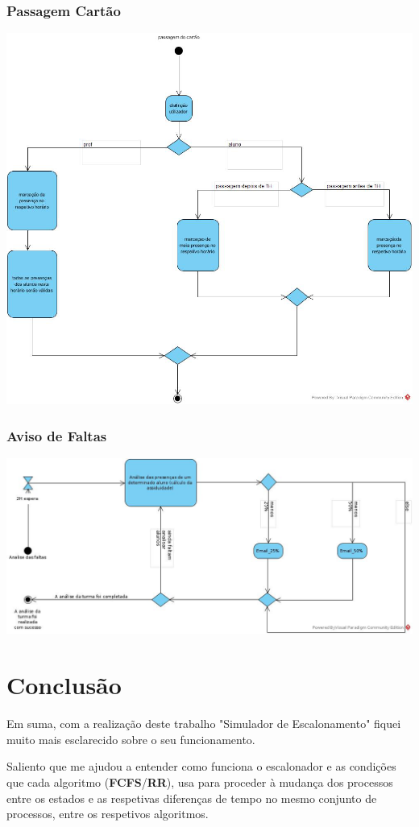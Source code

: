 \documentclass[11pt]{article}   %
\begin{document}
\subsubsection{Passagem Cartão}
    \includegraphics[width=\textwidth]{images/diagrama_atividades_cartao.png}

\subsubsection{Aviso de Faltas}
    \includegraphics[width=\textwidth]{images/diagrama_atividades_faltas.png}

\newpage
\section{Conclusão} %
\hspace{0,5cm}Em suma, com a realização deste trabalho "Simulador de Escalonamento" fiquei muito mais esclarecido sobre o seu funcionamento. \par
Saliento que me ajudou a entender como funciona o escalonador e as condições que cada algoritmo (\textbf{FCFS}/\textbf{RR}), usa para proceder à mudança dos processos entre os estados e as respetivas diferenças de tempo no mesmo conjunto de processos, entre os respetivos algoritmos.  
\end{document}
